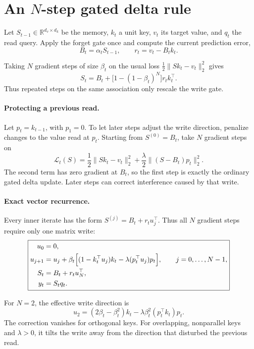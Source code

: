 \section*{An \(N\)-step gated delta rule}

Let \(S_{t-1}\in\mathbb{R}^{d_v\times d_k}\) be the memory,
\(k_t\) a unit key, \(v_t\) its target value, and \(q_t\) the read query.
Apply the forget gate once and compute the current prediction error,
\[
B_t=\alpha_t S_{t-1},
\qquad
r_t=v_t-B_tk_t.
\]

Taking \(N\) gradient steps of size \(\beta_t\) on the usual loss
\(\tfrac12\|Sk_t-v_t\|_2^2\) gives
\[
S_t=B_t+\bigl[1-(1-\beta_t)^N\bigr]r_tk_t^\top.
\]
Thus repeated steps on the same association only rescale the write gate.

\paragraph{Protecting a previous read.}
Let \(p_t=k_{t-1}\), with \(p_1=0\). To let later steps adjust the
write direction, penalize changes to the value read at \(p_t\).
Starting from \(S^{(0)}=B_t\), take \(N\) gradient steps on
\[
\mathcal{L}_t(S)
=
\frac12\|Sk_t-v_t\|_2^2
+
\frac{\lambda}{2}\|(S-B_t)p_t\|_2^2.
\]
The second term has zero gradient at \(B_t\), so the first step is
exactly the ordinary gated delta update. Later steps can correct
interference caused by that write.

\paragraph{Exact vector recurrence.}
Every inner iterate has the form \(S^{(j)}=B_t+r_tu_j^\top\).
Thus all \(N\) gradient steps require only one matrix write:
\[
\boxed{
\begin{aligned}
u_0 &= 0,\\
u_{j+1}
&=u_j+\beta_t\Bigl[
  (1-k_t^\top u_j)k_t
  -\lambda(p_t^\top u_j)p_t
\Bigr],
\qquad j=0,\ldots,N-1,\\
S_t &= B_t+r_tu_N^\top,\\
y_t &= S_tq_t.
\end{aligned}
}
\]

For \(N=2\), the effective write direction is
\[
u_2
=(2\beta_t-\beta_t^2)k_t
-\lambda\beta_t^2(p_t^\top k_t)p_t.
\]
The correction vanishes for orthogonal keys. For overlapping,
nonparallel keys and \(\lambda>0\), it tilts the write away from
the direction that disturbed the previous read.
